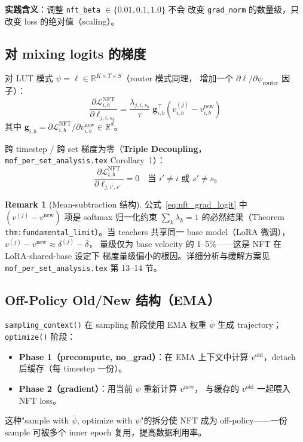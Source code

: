 \documentclass[11pt,a4paper]{article}
\newcommand{\loss}{\mathcal{L}}
\newcommand{\R}{\mathbb{R}}
\theoremstyle{definition}
\newtheorem{remark}{Remark}
\begin{document}
\textbf{实践含义}：调整 \texttt{nft\_beta} $\in \{0.01, 0.1, 1.0\}$ 不会
改变 \texttt{grad\_norm} 的数量级，只改变 loss 的绝对值（scaling）。

\subsection{对 mixing logits 的梯度}

对 LUT 模式 $\psi = \ell \in \R^{K \times T \times S}$（router 模式同理，
增加一个 $\partial \ell / \partial \psi_{\text{router}}$ 因子）：
\begin{equation}
\boxed{
\frac{\partial \loss_{i,b}^{\text{NFT}}}{\partial \ell_{j,i,s_b}}
= \frac{\lambda_{j,i,s_b}}{\tau}\;\mathbf{g}_{i,b}^\top\!\left(v^{(j)}_{i,b} - v_{i,b}^{\text{new}}\right)
}
\label{eq:nft_grad_logit}
\end{equation}
其中 $\mathbf{g}_{i,b} = \partial \loss_{i,b}^{\text{NFT}} / \partial v_{i,b}^{\text{new}}\in \R^d$。

跨 timestep / 跨 set 梯度为零（\textbf{Triple Decoupling}，
\texttt{mof\_per\_set\_analysis.tex} Corollary~1）：
\begin{equation}
\frac{\partial \loss_{i,b}^{\text{NFT}}}{\partial \ell_{j,i',s'}} = 0
\quad\text{当 }i' \neq i \text{ 或 } s' \neq s_b
\end{equation}

\begin{remark}[Mean-subtraction 结构]
公式~\eqref{eq:nft_grad_logit} 中 $(v^{(j)} - v^{\text{new}})$ 项是 softmax
归一化约束 $\sum_k \lambda_k = 1$ 的必然结果（Theorem
\texttt{thm:fundamental\_limit}）。当 teachers 共享同一 base model（LoRA
微调），$v^{(j)} - v^{\text{new}} \approx \delta^{(j)} - \bar\delta$，
量级仅为 base velocity 的 1--5\%——这是 NFT 在 LoRA-shared-base 设定下
梯度量级偏小的根因。详细分析与缓解方案见
\texttt{mof\_per\_set\_analysis.tex} 第 13--14 节。
\end{remark}

\subsection{Off-Policy Old/New 结构（EMA）}

\texttt{sampling\_context()} 在 sampling 阶段使用 EMA 权重 $\bar\psi$
生成 trajectory；\texttt{optimize()} 阶段：
\begin{itemize}[leftmargin=1.5em]
\item \textbf{Phase 1（precompute, no\_grad）}：在 EMA 上下文中计算
  $v^{\text{old}}$，detach 后缓存（每 timestep 一份）。
\item \textbf{Phase 2（gradient）}：用当前 $\psi$ 重新计算 $v^{\text{new}}$，
  与缓存的 $v^{\text{old}}$ 一起喂入 NFT loss。
\end{itemize}
这种"sample with $\bar\psi$, optimize with $\psi$"的拆分使 NFT 成为
off-policy——一份 sample 可被多个 inner epoch 复用，提高数据利用率。
\end{document}
